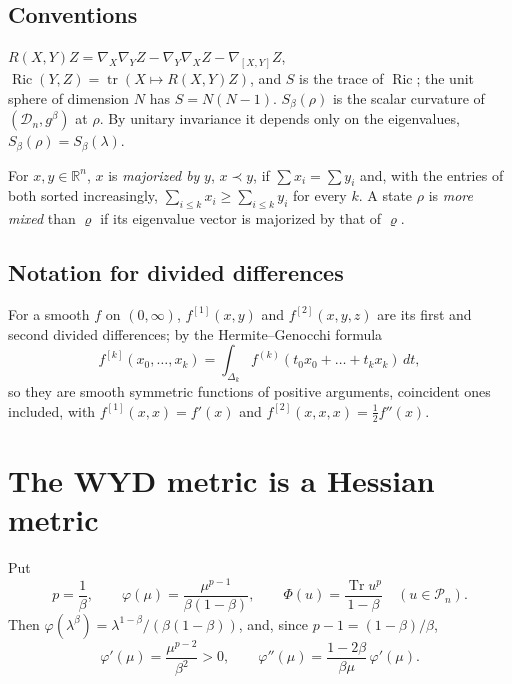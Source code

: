\documentclass[11pt]{amsart}
\theoremstyle{definition}
\numberwithin{equation}{section}
\newcommand{\R}{\mathbb{R}}
\newcommand{\Pn}{\mathcal{P}_n}
\newcommand{\Dn}{\mathcal{D}_n}
\newcommand{\Tr}{\operatorname{Tr}}
\newcommand{\tr}{\operatorname{tr}}
\newcommand{\Ric}{\operatorname{Ric}}
\begin{document}
\subsection*{Conventions} $R(X,Y)Z=\nabla_X\nabla_YZ-\nabla_Y\nabla_XZ-\nabla_{[X,Y]}Z$, $\Ric(Y,Z)=\tr(X\mapsto R(X,Y)Z)$, and $S$ is the
trace of $\Ric$; the unit sphere of dimension $N$ has $S=N(N-1)$. $S_\beta(\rho)$ is the scalar curvature of $(\Dn,g^\beta)$ at $\rho$. By unitary
invariance it depends only on the eigenvalues, $S_\beta(\rho)=S_\beta(\lambda)$.

For $x,y\in\R^n$, $x$ is \emph{majorized by} $y$, $x\prec y$, if $\sum x_i=\sum y_i$ and, with the entries of both sorted increasingly,
$\sum_{i\le k}x_i\ge\sum_{i\le k}y_i$ for every $k$. A state $\rho$ is \emph{more mixed} than $\varrho$ if its eigenvalue vector is majorized by that
of $\varrho$.

\subsection*{Notation for divided differences} For a smooth $f$ on $(0,\infty)$, $f^{[1]}(x,y)$ and $f^{[2]}(x,y,z)$ are its first and second divided
differences; by the Hermite--Genocchi formula
\begin{equation}\label{eq:HG}
f^{[k]}(x_0,\dots,x_k)=\int_{\Delta_k}f^{(k)}(t_0x_0+\dots+t_kx_k)\,dt,
\end{equation}
so they are smooth symmetric functions of positive arguments, coincident ones included, with $f^{[1]}(x,x)=f'(x)$ and $f^{[2]}(x,x,x)=\frac12f''(x)$.

\section{The WYD metric is a Hessian metric}

Put
\begin{equation}
p=\frac1\beta,\qquad \varphi(\mu)=\frac{\mu^{p-1}}{\beta(1-\beta)},\qquad \Phi(u)=\frac{\Tr u^{p}}{1-\beta}\quad(u\in\Pn).
\end{equation}
Then $\varphi(\lambda^\beta)=\lambda^{1-\beta}/(\beta(1-\beta))$, and, since $p-1=(1-\beta)/\beta$,
\begin{equation}\label{eq:phiprime}
\varphi'(\mu)=\frac{\mu^{p-2}}{\beta^2}>0 ,\qquad \varphi''(\mu)=\frac{1-2\beta}{\beta\mu}\,\varphi'(\mu).
\end{equation}
\end{document}
